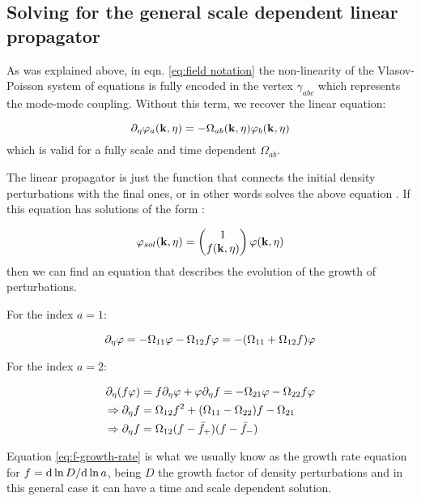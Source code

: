 \subsection{Solving for the general scale dependent linear propagator \label{sub:linear propagator}}

As was explained above, in eqn. \ref{eq:field notation} the non-linearity
of the Vlasov-Poisson system of equations is fully encoded in the
vertex $\gamma_{abc}$ which represents the mode-mode coupling. Without
this term, we recover the linear equation:

\begin{equation}
\partial_{\eta}\varphi_{a}(\mathbf{k},\eta)=-\Omega_{ab}(\mathbf{k},\eta)\varphi_{b}(\mathbf{k},\eta)\label{eq:2.1}
\end{equation}
which is valid for a fully scale and time dependent $\Omega_{ab}$.

The linear propagator is just the function that connects the initial
density perturbations with the final ones, or in other words solves
the above equation \cite{crocce_renormalized_2005}. If this equation
has solutions of the form \cite{pietroni_flowing_2008}:

\[
\varphi_{sol}(\mathbf{k},\eta)=\begin{pmatrix}1\\
f(\mathbf{k},\eta)
\end{pmatrix}\varphi(\mathbf{k},\eta)
\]
then we can find an equation that describes the evolution of the growth
of perturbations.

For the index $a=1$:

\begin{equation}
\partial_{\eta}\varphi=-\Omega_{11}\varphi-\Omega_{12}f\varphi=-(\Omega_{11}+\Omega_{12}f)\varphi\label{eq:linear-phi-eqn}
\end{equation}


For the index $a=2$:

\begin{align}
\partial_{\eta}(f\varphi) & =f\partial_{\eta}\varphi+\varphi\partial_{\eta} f=-\Omega_{21}\varphi-\Omega_{22}f\varphi\nonumber \\
\Rightarrow\partial_{\eta} f & =\Omega_{12}f^{2}+(\Omega_{11}-\Omega_{22})f-\Omega_{21}\label{eq:f-growth-rate}\\
\Rightarrow\partial_{\eta} f & =\Omega_{12}(f-\bar{f}_{+})(f-\bar{f}_{-})\label{eq:fgrowth-factorized-eqn}
\end{align}


Equation \ref{eq:f-growth-rate} is what we usually know as the growth
rate equation for $f=\mathrm{d}\ln D/\mathrm{d}\ln a$, being $D$ the growth factor
of density perturbations and in this general case it can have a time
and scale dependent solution.

